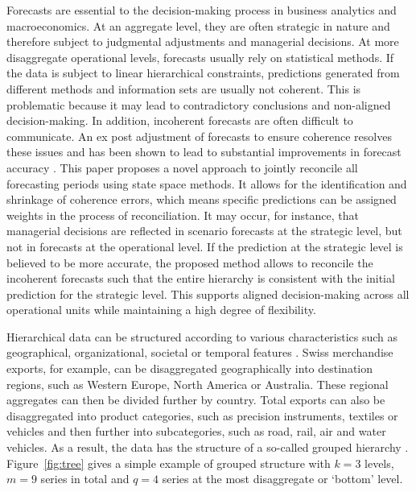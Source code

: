 \documentclass[a4paper,fleqn,11pt]{article}
\begin{document}
Forecasts are essential to the decision-making process in business analytics and macroeconomics. At an aggregate level, they are often strategic in nature and therefore subject to judgmental adjustments and managerial decisions. At more disaggregate operational levels, forecasts usually rely on statistical methods. If the data is subject to linear hierarchical constraints, predictions generated from different methods and information sets are usually not coherent. This is problematic because it may lead to contradictory conclusions and non-aligned decision-making. In addition, incoherent forecasts are often difficult to communicate. An ex post adjustment of forecasts to ensure coherence resolves these issues and has been shown to lead to substantial improvements in forecast accuracy \citep[see][and references therein]{Wickramasuriya2015}. This paper proposes a novel approach to jointly reconcile all forecasting periods using state space methods. It allows for the identification and shrinkage of coherence errors, which means specific predictions can be assigned weights in the process of reconciliation. It may occur, for instance, that managerial decisions are reflected in scenario forecasts at the strategic level, but not in forecasts at the operational level. If the prediction at the strategic level is believed to be more accurate, the proposed method allows to reconcile the incoherent forecasts such that the entire hierarchy is consistent with the initial prediction for the strategic level. This supports aligned decision-making across all operational units while maintaining a high degree of flexibility.

Hierarchical data can be structured according to various characteristics such as geographical, organizational, societal or temporal features \citep{Kourentzes2019}. Swiss merchandise exports, for example, can be disaggregated geographically into destination regions, such as Western Europe, North America or Australia. These regional aggregates can then be divided further by country. Total exports can also be disaggregated into product categories, such as precision instruments, textiles or vehicles and then further into subcategories, such as road, rail, air and water vehicles. As a result, the data has the structure of a so-called grouped hierarchy \citep[see][and references therein]{Hyndman2018}. Figure~\ref{fig:tree} gives a simple example of grouped structure with $k = 3$ levels, $m = 9$ series in total and $q = 4$ series at the most disaggregate or `bottom' level. 
\end{document}
